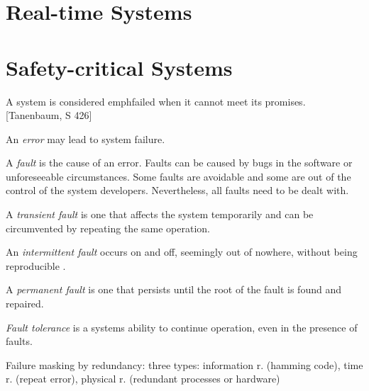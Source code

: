 \section{Real-time Systems}

\section{Safety-critical Systems}
A system is considered emph{failed} when it cannot meet its promises. [Tanenbaum, S 426]

An \emph{error} may lead to system failure.

A \emph{fault} is the cause of an error. Faults can be caused by bugs in the software or unforeseeable circumstances. Some faults are avoidable and some are out of the control of the system developers. Nevertheless, all faults need to be dealt with.

A \emph{transient fault} is one that affects the system temporarily and can be circumvented by repeating the same operation.

An \emph{intermittent fault} occurs on and off, seemingly out of nowhere, without being reproducible .

A \emph{permanent fault} is one that persists until the root of the fault is found and repaired.

\emph{Fault tolerance} is a systems ability to continue operation, even in the presence of faults.

Failure masking by redundancy: three types: information r. (hamming code), time r. (repeat error), physical r. (redundant processes or hardware)









%
%
%
%
%
%
%
%
%
%

